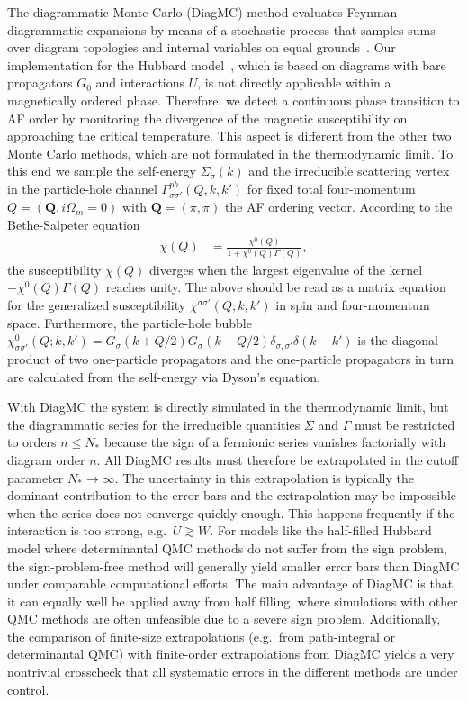 \documentclass[twocolumn,superscriptaddress,pra,showpacs,longbibliography]{revtex4-1}
\newcommand{\<}{\langle}
\renewcommand{\>}{\rangle}
\begin{document}
The diagrammatic Monte Carlo (DiagMC) method evaluates Feynman diagrammatic expansions by means of a stochastic process that samples sums over diagram topologies and internal variables on equal grounds~\cite{prokofev2007bdm, prokofev2008fpp}.
Our implementation for the Hubbard model~\cite{Gukelberger:2014dba,gukelberger2015diss}, which is based on diagrams with bare propagators $G_0$ and interactions $U$, is not directly applicable within a magnetically ordered phase. Therefore, we detect a continuous phase transition to AF order by monitoring the divergence of the magnetic susceptibility on approaching the critical temperature. This aspect is different from the other two Monte Carlo methods, which are not formulated in the thermodynamic limit.
To this end we sample the self-energy $\Sigma_\sigma(k)$ and the irreducible scattering vertex in the particle-hole channel $\Gamma^{ph}_{\sigma \sigma'}(Q, k, k')$ for fixed total four-momentum $Q=(\pmb{Q}, i \Omega_m=0)$ with $\pmb{Q}=(\pi, \pi)$ the AF ordering vector.
According to the Bethe-Salpeter equation
\begin{align}
\chi(Q) &= \frac{\chi^{0}(Q)}{1 + \chi^{0}(Q) \Gamma(Q)},
\end{align}
the susceptibility $\chi(Q)$ diverges when the largest eigenvalue of the kernel $-\chi^{0}(Q) \Gamma(Q)$ reaches unity.
The above should be read as a matrix equation for the generalized susceptibility $\chi^{\sigma \sigma'}(Q; k, k')$ in spin and four-momentum space. Furthermore, the particle-hole bubble $\chi^{0}_{\sigma \sigma'}(Q; k, k') = G_\sigma(k+Q/2) G_\sigma(k-Q/2) \delta_{\sigma, \sigma'} \delta(k-k')$ is the diagonal product of two one-particle propagators and the one-particle propagators in turn are calculated from the self-energy via Dyson's equation.

With DiagMC the system is directly simulated in the thermodynamic limit, but the diagrammatic series for the irreducible quantities $\Sigma$ and $\Gamma$ must be restricted to orders $n \leq N_*$ because the sign of a fermionic series vanishes factorially with diagram order $n$.
All DiagMC results must therefore be extrapolated in the cutoff parameter $N_* \to \infty$. The uncertainty in this extrapolation is typically the dominant contribution to the error bars and the extrapolation may be impossible when the series does not converge quickly enough. This happens frequently if the interaction is too strong, e.g.\ $U \gtrsim W$. 
For models like the half-filled Hubbard model where determinantal QMC methods do not suffer from the sign problem, the sign-problem-free method will generally yield smaller error bars than DiagMC under comparable computational efforts.
The main advantage of DiagMC is that it can equally well be applied away from half filling, where simulations with other QMC methods are often unfeasible due to a severe sign problem.
Additionally, the comparison of finite-size extrapolations (e.g.\ from path-integral or determinantal QMC) with finite-order extrapolations from DiagMC yields a very nontrivial crosscheck that all systematic errors in the different methods are under control.
\end{document}
